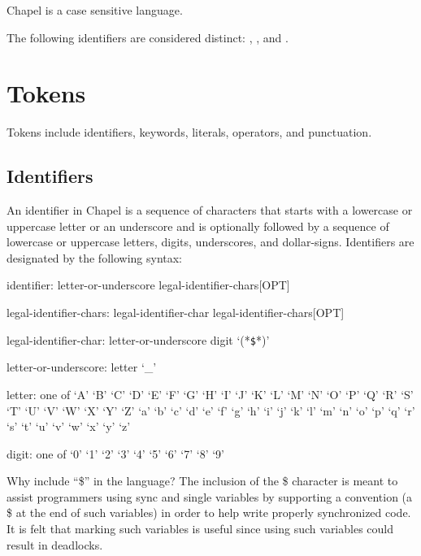 Chapel is a case sensitive language.

\begin{example}
The following identifiers are considered
distinct: , , and .
\end{example}

\section{Tokens}
\label{Tokens}

Tokens include identifiers, keywords, literals, operators, and
punctuation.

\subsection{Identifiers}
\label{Identifiers}

An identifier in Chapel is a sequence of characters that starts with a
lowercase or uppercase letter or an underscore and is optionally
followed by a sequence of lowercase or uppercase letters, digits,
underscores, and dollar-signs.  Identifiers are designated by the
following syntax:
\begin{syntax}
identifier:
  letter-or-underscore legal-identifier-chars[OPT]

legal-identifier-chars:
  legal-identifier-char legal-identifier-chars[OPT]

legal-identifier-char:
  letter-or-underscore
  digit
  `(*\texttt{\$}*)'

letter-or-underscore:
  letter
  `_'

letter: one of
  `A' `B' `C' `D' `E' `F' `G' `H' `I' `J' `K' `L' `M' `N' `O' `P' `Q' `R' `S' `T' `U' `V' `W' `X' `Y' `Z'
  `a' `b' `c' `d' `e' `f' `g' `h' `i' `j' `k' `l' `m' `n' `o' `p' `q' `r' `s' `t' `u' `v' `w' `x' `y' `z'

digit: one of
  `0' `1' `2' `3' `4' `5' `6' `7' `8' `9'
\end{syntax}

\begin{rationale}
Why include ``\$'' in the language?  The inclusion of the \$ character
is meant to assist programmers using sync and single variables by
supporting a convention (a \$ at the end of such variables) in order
to help write properly synchronized code.  It is felt that marking
such variables is useful since using such variables could result in
deadlocks.
\end{rationale}

